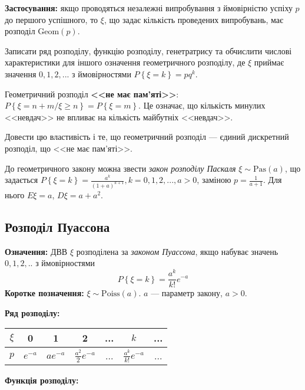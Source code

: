 \noindent\textbf{Застосування:} якщо проводяться незалежні випробування з ймовірністю успіху $p$ до першого успішного,
то $\xi$, що задає кількість проведених випробувань, має розподіл $\mathrm{Geom}(p)$.

\begin{exercise}
    Записати ряд розподілу, функцію розподілу, генетратрису та обчислити
    числові характеристики для іншого означення геометричного розподілу, 
    де $\xi$ приймає значення $0,1,2,...$ з ймовірностями $P\left\{\xi = k\right\} = pq^k$.
\end{exercise}
Геометричний розподіл \textbf{<<не має пам'яті>>}: $P\left\{\xi = n+m / \xi \geq n\right\} = P\left\{\xi = m\right\}$.
Це означає, що кількість минулих <<невдач>> не впливає на кількість майбутніх <<невдач>>.
\begin{exercise}
    Довести цю властивість і те, що геометричний розподіл --- 
    єдиний дискретний розподіл, що <<не має пам'яті>>.
\end{exercise}
До геометричного закону можна звести \emph{закон розподілу Паскаля} $\xi \sim \mathrm{Pas}(a)$,
що задається $P\left\{\xi = k\right\} = \frac{a^k}{(1+a)^{k+1}}, k = 0,1,2,..., a>0$,
заміною $p=\frac{1}{a+1}$. Для нього $E\xi = a$, $D\xi = a + a^2$.

\subsection{Розподіл Пуассона}
\noindent\textbf{Означення:}
    ДВВ $\xi$ розподілена за \emph{законом Пуассона}, 
    якщо набуває значень $0,1,2,..$ з ймовірностями \begin{equation}
        P\left\{\xi = k\right\} = \frac{a^k}{k!}e^{-a}
    \end{equation}
    \textbf{Коротке позначення:} $\xi \sim \mathrm{Poiss}(a)$.
    $a$ --- параметр закону, $a > 0$.

\noindent\textbf{Ряд розподілу:}

\begin{tabular}{c|c|c|c|c|c|c}
    $\xi$ & 0 & 1 & 2 & ... & $k$ & ... \\
    \hline
    $p$ & $e^{-a}$ & $ae^{-a}$ & $\frac{a^2}{2}e^{-a}$ & ... & $\frac{a^k}{k!}e^{-a}$ & ...
\end{tabular}

\noindent\textbf{Функція розподілу:}

